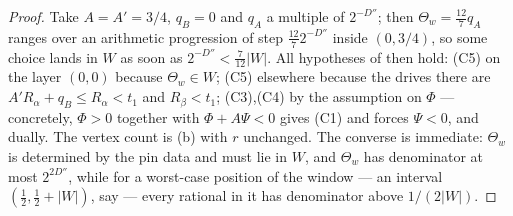 \begin{proof}
Take $A=A'=3/4$, $q_B=0$ and $q_A$ a multiple of $2^{-D''}$; then
$\Theta_w=\tfrac{12}{7}q_A$ ranges over an arithmetic progression of step
$\tfrac{12}{7}2^{-D''}$ inside $(0,3/4)$, so some choice lands in $W$ as soon
as $2^{-D''}<\tfrac{7}{12}|W|$. All hypotheses of  then hold:
(C5) on the layer $(0,0)$ because $\Theta_w\in W$; (C5) elsewhere because the
drives there are $A'R_\alpha+q_B\le R_\alpha<t_1$ and $R_\beta<t_1$; (C3),(C4)
by the assumption on $\Phi$ --- concretely, $\Phi>0$
together with $\Phi+A\Psi<0$ gives (C1) and forces $\Psi<0$, and dually. The
vertex count is (b) with $r$ unchanged. The converse
is immediate: $\Theta_w$ is determined by the pin data and must lie in $W$,
and $\Theta_w$ has denominator at most $2^{2D''}$, while for a worst-case
position of the window --- an interval $(\tfrac12,\tfrac12+|W|)$, say --- every
rational in it has denominator above $1/(2|W|)$.
\end{proof}

